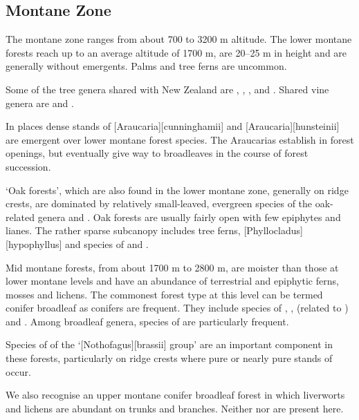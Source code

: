 \subsection{Montane Zone}

The montane zone ranges from about 700 to 3200 m altitude.
The lower montane forests reach up to an average altitude of 1700 m, are 20–25 m in height and are generally without emergents.
Palms and tree ferns are uncommon.

Some of the tree genera shared with New Zealand are , , ,  and .
Shared vine genera are  and .

In places dense stands of [Araucaria][cunninghamii] and [Araucaria][hunsteinii] are emergent over lower montane forest species.
The Araucarias establish in forest openings, but eventually give way to broadleaves in the course of forest succession.

`Oak forests', which are also found in the lower montane zone, generally on ridge crests, are dominated by relatively small-leaved, evergreen species of the oak-related genera  and .
Oak forests are usually fairly open with few epiphytes and lianes.
The rather sparse subcanopy includes tree ferns, [Phyllocladus][hypophyllus] and species of  and .

Mid montane forests, from about 1700 m to 2800 m, are moister than those at lower montane levels and have an abundance of terrestrial and epiphytic ferns, mosses and lichens.
The commonest forest type at this level can be termed conifer broadleaf as conifers are frequent.
They include species of , ,  (related to ) and .
Among broadleaf genera, species of  are particularly frequent.

Species of  of the `[Nothofagus][brassii] group' are an important component in these forests, particularly on ridge crests where pure or nearly pure stands of  occur.

We also recognise an upper montane conifer broadleaf forest in which liverworts and lichens are abundant on trunks and branches.
Neither  nor  are present here.

